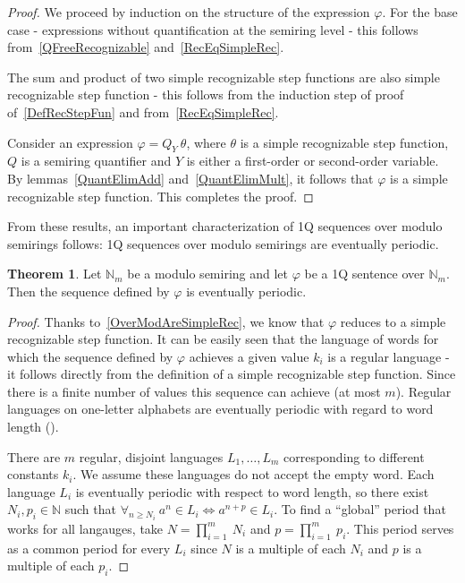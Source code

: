 \documentclass[en]{pracamgr}
\theoremstyle{definition}
\newtheorem{theorem}{Theorem}[section]
\begin{document}
\begin{proof}
    We proceed by induction on the structure of the expression $\varphi$. For the base case - expressions without quantification at the semiring level - this follows from~\cref{QFreeRecognizable} and~\cref{RecEqSimpleRec}. 
    
    The sum and product of two simple recognizable step functions are also simple recognizable step function - this follows from the induction step of proof of~\cref{DefRecStepFun} and from~\cref{RecEqSimpleRec}.

    Consider an expression $\varphi = Q_Y \ \theta$, where $\theta$ is a simple recognizable step function, $Q$ is a semiring quantifier and $Y$ is either a first-order or second-order variable. By lemmas~\ref{QuantElimAdd} and~\ref{QuantElimMult}, it follows that $\varphi$ is a simple recognizable step function. This completes the proof.
\end{proof}

From these results, an important characterization of 1Q sequences over modulo semirings follows: 1Q sequences over modulo semirings are eventually periodic.

\begin{theorem}
    \label{OverModAreSimpleRec2}
    Let $\mathbb{N}_m$ be a modulo semiring and let $\varphi$ be a 1Q sentence over $\mathbb{N}_m$. Then the sequence defined by $\varphi$ is eventually periodic.
\end{theorem}

\begin{proof}
    Thanks to~\cref{OverModAreSimpleRec}, we know that $\varphi$ reduces to a simple recognizable step function. It can be easily seen that the language of words for which the sequence defined by $\varphi$ achieves a given value $k_i$ is a regular language - it follows directly from the definition of a simple recognizable step function. Since there is a finite number of values this sequence can achieve (at most $m$). Regular languages on one-letter alphabets are eventually periodic with regard to word length (\cite[Theorem 1]{PighizziniS02}).

    There are $m$ regular, disjoint languages $L_1, \ldots, L_m$ corresponding to different constants $k_i$. We assume these languages do not accept the empty word. Each language $L_i$ is eventually periodic with respect to word length, so there exist $N_i, p_i \in \mathbb{N}$ such that $\forall_{n \geq N_i} \ a^n \in L_i \iff a^{n + p} \in L_i$. To find a ``global'' period that works for all langauges, take $N = \prod_{i=1}^m \ N_i$ and $p = \prod_{i=1}^m \ p_i$. This period serves as a common period for every $L_i$ since $N$ is a multiple of each $N_i$ and $p$ is a multiple of each $p_i$.
\end{proof}
\end{document}
